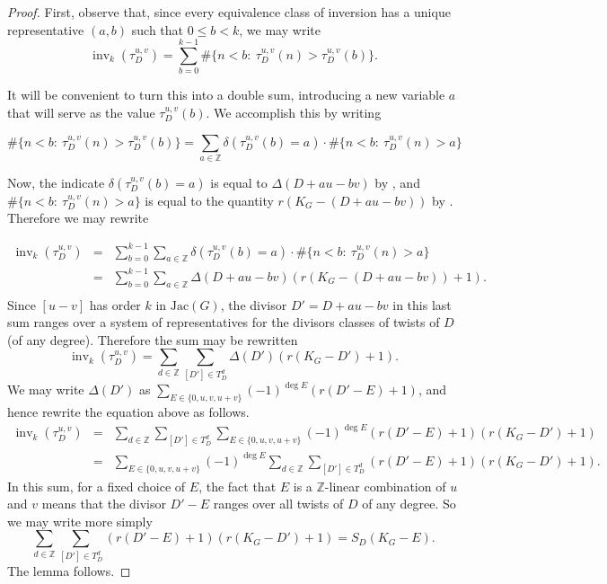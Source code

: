 \documentclass[11pt]{article}
\theoremstyle{definition}
\numberwithin{equation}{section}
\newcommand{\Z}{\mathbb{Z}}
\newcommand{\jac}[1]{\mathrm{Jac}\left({#1}\right)}
\newcommand{\inv}{\operatorname{inv}}
\newcommand{\tauD}{\tau^{u,v}_D}
\begin{document}
\begin{proof}
First, observe that, since every equivalence class of inversion has a unique representative $(a,b)$ such that $0 \leq b < k$,  we may write
$$
\inv_k(\tauD)
=
\sum_{b=0}^{k-1} \# \{ n < b:\ \tauD(n) > \tauD(b) \}.
$$

It will be convenient to turn this into a double sum, introducing a new variable $a$ that will serve as the value $\tauD(b)$. We accomplish this by writing

\[ \# \{ n < b:\ \tauD(n) > \tauD(b) \} 
= \sum_{a \in \Z} \delta(\tauD(b) = a) \cdot \# \{n < b:\ \tauD(n) > a\}
\]

Now, the indicate $\delta(\tauD(b) = a)$ is equal to $\Delta( D + au-bv)$ by , and $\# \{n < b:\ \tauD(n) > a\}$ is equal to the quantity $r(K_G - (D+au-bv))$ by . Therefore we may rewrite

\begin{eqnarray*}
\inv_k(\tauD) &=&
\sum_{b=0}^{k-1} \sum_{a \in \Z} \delta(\tauD(b) = a) \cdot \# \{n < b:\ \tauD(n) > a\}\\
&=& \sum_{b=0}^{k-1} \sum_{a \in \Z} \Delta(D + au - bv) \left( r(K_G-(D+au-bv)) + 1 \right).\\
\end{eqnarray*}
Since $[u-v]$ has order $k$ in $\jac{G}$, the divisor $D' = D + au - bv$ in this last sum ranges over a system of representatives for the divisors classes of twists of $D$ (of any degree). Therefore the sum may be rewritten
$$
\inv_k(\tauD) = \sum_{d \in \Z} \sum_{[D'] \in T^d_D} \Delta( D') \left( r(K_G-D') + 1 \right).
$$
We may write $\Delta(D')$ as 
$\displaystyle \sum_{E \in \{0,u,v,u+v\}} (-1)^{\deg E} \left( r(D' - E) + 1 \right)$, and hence rewrite the equation above as follows.
\begin{eqnarray*}
\inv_k(\tauD) &=& \sum_{d \in \Z} \sum_{[D'] \in T^d_D} \sum_{E \in \{0,u,v,u+v\}} (-1)^{\deg E} \left( r(D'-E) + 1 \right) \left( r(K_G-D') + 1 \right)\\
&=& \sum_{E \in \{0,u,v,u+v\}} (-1)^{\deg E} \sum_{d \in \Z} \sum_{[D'] \in T^d_D} \left( r(D'-E) + 1 \right) \left( r(K_G-D') + 1 \right).
\end{eqnarray*}
In this sum, for a fixed choice of $E$, the fact that $E$ is a $\Z$-linear combination of $u$ and $v$ means that the divisor $D' - E$ ranges over all twists of $D$ of any degree. So we may write more simply 
$$
\sum_{d \in \Z} \sum_{[D'] \in T^d_D} \left( r(D'-E) + 1 \right) \left( r(K_G-D') + 1 \right) = S_D(K_G - E).
$$
The lemma follows.
\end{proof}
\end{document}

